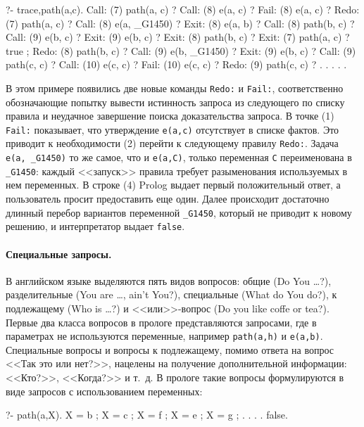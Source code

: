 \documentclass[a4paper,14pt, openany, twoside, final]{extbook} %
\begin{document}
\begin{proexp}
?- trace,path(a,c).
   Call: (7) path(a, c) ?
   Call: (8) e(a, c) ?
   Fail: (8) e(a, c) ?        %
   Redo: (7) path(a, c) ?     %
   Call: (8) e(a, _G1450) ?   %
   Exit: (8) e(a, b) ?
   Call: (8) path(b, c) ?
   Call: (9) e(b, c) ?
   Exit: (9) e(b, c) ?
   Exit: (8) path(b, c) ?
   Exit: (7) path(a, c) ?
true ;                        %
   Redo: (8) path(b, c) ?
   Call: (9) e(b, _G1450) ?
   Exit: (9) e(b, c) ?
   Call: (9) path(c, c) ?
   Call: (10) e(c, c) ?
   Fail: (10) e(c, c) ?
   Redo: (9) path(c, c) ?     %
   . . . . .
\end{proexp}


В этом примере появились две новые команды \texttt{Redo:} и \texttt{Fail:}, соответственно обозначающие попытку вывести истинность запроса из следующего по списку правила и неудачное завершение поиска доказательства запроса.  В точке (1) \texttt{Fail:} показывает, что утверждение \texttt{e(a,c)} отсутствует в списке фактов.  Это приводит к необходимости (2) перейти к следующему правилу \texttt{Redo:}.  Задача \texttt{e(a, \_G1450)} то же самое, что и \texttt{e(a,C)}, только переменная \texttt{C} переименована в \texttt{\_G1450}: каждый <<запуск>> правила требует разыменования используемых в нем переменных.  В строке (4) Prolog выдает первый положительный ответ, а пользователь просит предоставить еще один.  Далее происходит достаточно длинный перебор вариантов переменной \texttt{\_G1450}, который не приводит к новому решению, и интерпретатор выдает \texttt{false}.

\paragraph{Специальные запросы.} В английском языке выделяются пять видов вопросов: общие (Do You \ldots{}?), разделительные (You are \ldots{}, ain't You?), специальные (What do You do?), к подлежащему (Who is \ldots{}?) и <<или>>-вопрос (Do you like coffe or tea?).  Первые два класса вопросов в прологе представляются запросами, где в параметрах не используются переменные, например \texttt{path(a,h)} и \texttt{e(a,b)}.  Специальные вопросы и вопросы к подлежащему, помимо ответа на вопрос <<Так это или нет?>>, нацелены на получение дополнительной информации: <<Кто?>>, <<Когда?>> и т.~д.  В прологе такие вопросы формулируются в виде запросов с использованием переменных:

\begin{proexp}
?- path(a,X).
X = b ;
X = c ;
X = f ;
X = e ;
X = g ;
. . . .
false.
\end{proexp}
\end{document}
